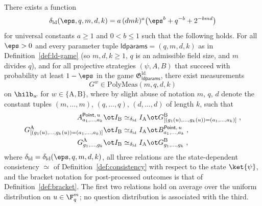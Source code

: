 \begin{theorem}\label{lem:ld-soundness}
	There exists a function
	\[
		\delta_{\mathrm{ld}}(\eps, q, m, d, k) = a\,(dmk)^a \bigl(\eps^b + q^{-b} + 2^{-bmd}\bigr)
	\]
	for universal constants $a \ge 1$ and $0 < b \le 1$ such that the following holds. For all $\eps > 0$ and every parameter tuple $\mathsf{ldparams} = (q,m,d,k)$ as in Definition~\ref{def:ld-game} (so $m, d, k \ge 1$, $q$ is an admissible field size, and $m$ divides $q$), and for all projective strategies $(\psi, A, B)$ that succeed with probability at least $1-\eps$ in the game $\mathfrak{G}^{\mathrm{ld}}_{\mathsf{ldparams}}$, there exist measurements
	\[
		G^w \in \mathrm{PolyMeas}(m,q,d,k)
	\]
	on $\hilb_w$ for $w \in \{\mathrm A,\mathrm B\}$, where by slight abuse of notation $m$, $q$, $d$ denote the constant tuples $(m,\ldots,m)$, $(q,\ldots,q)$, $(d,\ldots,d)$ of length $k$, such that
	\begin{align*}
		A^{\mathsf{Point},\, u}_{a_1,\ldots,a_k} \ot I_{\mathrm B}
		&\simeq_{\delta_{\mathrm{ld}}}
		I_{\mathrm A} \ot G^{\mathrm B}_{[(g_1(u),\ldots,g_k(u)) = (a_1,\ldots,a_k)]}\;,\\
		G^{\mathrm A}_{[(g_1(u),\ldots,g_k(u)) = (a_1,\ldots,a_k)]} \ot I_{\mathrm B}
		&\simeq_{\delta_{\mathrm{ld}}}
		I_{\mathrm A} \ot B^{\mathsf{Point},\, u}_{a_1,\ldots,a_k}\;,\\
		G^{\mathrm A}_{g_1,\ldots,g_k} \ot I_{\mathrm B}
		&\simeq_{\delta_{\mathrm{ld}}}
		I_{\mathrm A} \ot G^{\mathrm B}_{g_1,\ldots,g_k}\;,
	\end{align*}
	where $\delta_{\mathrm{ld}} = \delta_{\mathrm{ld}}(\eps,q,m,d,k)$, all three relations are the state-dependent consistency $\simeq$ of Definition~\ref{def:consistency} with respect to the state $\ket{\psi}$, and the bracket notation for post-processed outcomes is that of Definition~\ref{def:bracket}. The first two relations hold on average over the uniform distribution on $u \in \F_q^m$; no question distribution is associated with the third.
\end{theorem}
